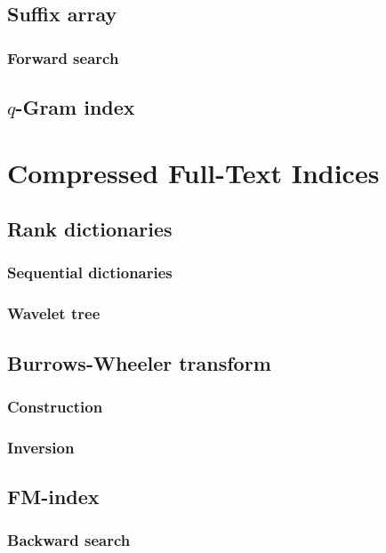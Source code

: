 \section{Suffix array}
\subsection{Forward search}
\section{$q$-Gram index}

\chapter{Compressed Full-Text Indices}
\section{Rank dictionaries}
\subsection{Sequential dictionaries}
\subsection{Wavelet tree}
\section{Burrows-Wheeler transform}
\subsection{Construction}
\subsection{Inversion}
\section{FM-index}
\subsection{Backward search}
